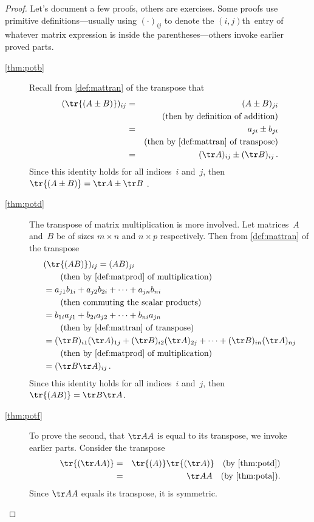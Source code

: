 \begin{proof} 
Let's document a few proofs, others are exercises.
Some proofs use primitive definitions---usually using \((\cdot)_{ij}\) to denote the \((i,j)\)th~entry of whatever matrix expression is inside the parentheses---others invoke earlier proved parts.
\begin{description}
\item[\ref{thm:potb}]
Recall from \cref{def:mattran} of the transpose that
\begin{eqnarray*}
(\tr{(A\pm B)})_{ij}
&=&(A\pm B)_{ji}
\\&&(\text{then by definition of addition})
\\&=&a_{ji}\pm b_{ji}
\\&&(\text{then by \cref{def:mattran} of transpose})
\\&=&(\tr A)_{ij}\pm(\tr B)_{ij}\,.
\end{eqnarray*}
Since this identity holds for all indices~\(i\) and~\(j\), then \(\tr{(A\pm B)}=\tr A\pm \tr B\) .

\item[\ref{thm:potd}]
The transpose of matrix multiplication is more involved.
Let matrices~\(A\) and~\(B\) be of sizes \(m\times n\) and \(n\times p\) respectively.  Then from \cref{def:mattran} of the transpose
\begin{align*}
&(\tr{(AB)})_{ij}=(AB)_{ji}
\\&\qquad(\text{then by \cref{def:matprod} of multiplication})
\\&=a_{j1}b_{1i}+a_{j2}b_{2i}+\cdots+a_{jn}b_{ni}
\\&\qquad(\text{then commuting the scalar products})
\\&=b_{1i}a_{j1}+b_{2i}a_{j2}+\cdots+b_{ni}a_{jn}
\\&\qquad(\text{then by \cref{def:mattran} of  transpose})
\\&=(\tr B)_{i1}(\tr A)_{1j}+(\tr B)_{i2}(\tr A)_{2j}+\cdots+(\tr B)_{in}(\tr A)_{nj}
\\&\qquad(\text{then by \cref{def:matprod} of multiplication})
\\&=(\tr B\tr A)_{ij}\,.
\end{align*}
Since this identity holds for all indices~\(i\) and~\(j\), then \(\tr{(AB)}=\tr B\tr A\).

\item[\ref{thm:potf}] To prove the second, that \(\tr AA\) is equal to its transpose, we invoke earlier parts.
Consider the transpose 
\begin{eqnarray*}
\tr{(\tr AA)}&=& \tr{(A)}\tr{(\tr A)}\quad(\text{by~\cref{thm:potd}})
\\&=&\tr AA\quad(\text{by~\cref{thm:pota}}).
\end{eqnarray*}
Since \(\tr AA\) equals its transpose, it is symmetric.
\end{description}
\end{proof}









